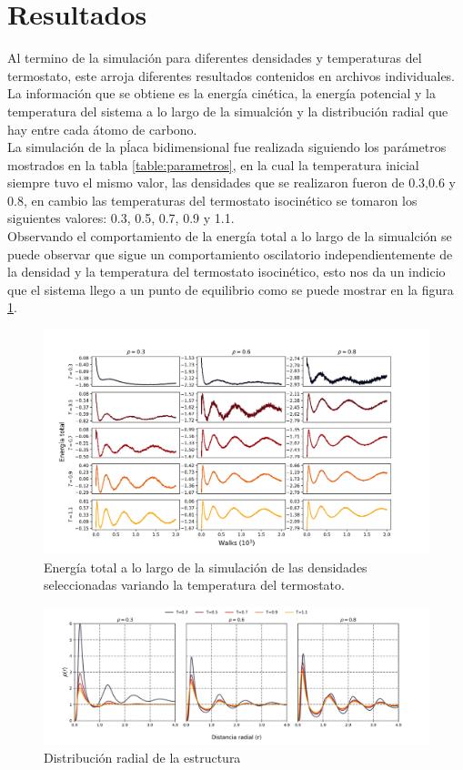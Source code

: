 \documentclass[reprint,amsmath,amssymb,aps,]{revtex4-2}
\begin{document}
\section{Resultados}
Al termino de la simulación para diferentes densidades y temperaturas del termostato, este arroja diferentes resultados contenidos en archivos individuales.
La información que se obtiene es la energía cinética, la energía potencial y la temperatura del sistema a lo largo de la simualción y la distribución radial que 
hay entre cada átomo de carbono.\\
La simulación de la pĺaca bidimensional fue realizada siguiendo los parámetros mostrados en la tabla \ref{table:parametros}, en la cual la temperatura inicial siempre tuvo el mismo valor,
las densidades que se realizaron fueron de 0.3,0.6 y 0.8, en cambio las temperaturas del termostato isocinético se tomaron los siguientes valores: 0.3, 0.5, 0.7, 0.9 y 1.1.\\
Observando el comportamiento de la energía total a lo largo de la simualción se puede observar que sigue un comportamiento oscilatorio
independientemente de la densidad y la temperatura del termostato isocinético, esto nos da un indicio que el sistema llego a un punto de
equilibrio como se puede mostrar en la figura \ref{fig:energy}.
\begin{figure}[H]
\hspace{-0.75cm}
\includegraphics[scale=0.275]{../Graphics/Energy.png}
\caption{Energía total a lo largo de la simulación de las densidades seleccionadas variando la temperatura del termostato.}
\label{fig:energy}
\end{figure}
\begin{figure}
    \hspace*{-1cm}
    \includegraphics[scale=0.45]{../Graphics/Dis_rad.png}
    \caption{Distribución radial de la estructura}
    \label{fig:disradial}
\end{figure}
\end{document}
